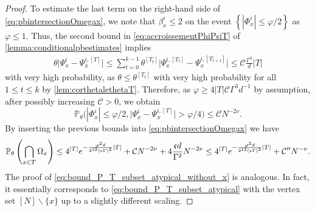 \documentclass[10pt,a4paper]{amsart}
\newcommand{\abs}[1]{\left| #1 \right|}
\newcommand{\ccc}{\mathfrak{c}}
\numberwithin{equation}{section}
\newcommand*\bset[1]{[#1]}
\newcommand{\nc}{\normalcolor}
\begin{document}
\begin{proof}
 To estimate the last term on the right-hand side of \cref{eq:pbintersectionOmegax}, we note that $\beta^{i}_x\le 2$ on the event $\left\{ \abs{\Phi^{i}_x} \le \varphi/2 \right\}$ as $\varphi \le 1$. Thus, the second bound in \cref{eq:accroissementPhiPsiT} of \cref{lemma:conditionalpbestimates} implies
		\begin{align*}
			\theta \bigl| \Psi_{x}^{i} - \Psi_{x}^{i,\bset{T}}\bigr| \le \sum_{t=0}^{k-1} \theta^{\bset{T_t}}\bigl| \Psi_{x}^{i, \bset{T_{t}}} - \Psi_{x}^{i,\bset{T_{t+1}}}\bigr| \le \mathcal{C} \frac{\Gamma^3}{d} \abs{T} 
		\end{align*}
		with very high probability, as 
		$\theta \le \theta^{\bset{T_t}}  $ with very high probability for all $ 1 \le t \le k $ by  \cref{lem:corthetalethetaT}.
 Therefore, as $\varphi \geq 4 \abs{T} \mathcal C \Gamma^{3} d^{-1}$ by assumption,
 after possibly increasing  $\mathcal{C}>0$, we obtain 
		\begin{equation*}
			\mathbb{P}_{\theta} \big( \abs{\Phi^{i}_x} \le \varphi/2,\bigl| \Psi_{x}^{i} - \Psi_{x}^{i,\bset{T}}\bigr| > \varphi/4 \big) \le \mathcal{C} N^{-2\nu}.
		\end{equation*}
		By inserting the previous bounds into \cref{eq:pbintersectionOmegax} we have
		\begin{equation*}
			\mathbb{P}_{\theta}\left( \bigcap_{x \in T}\Omega_x\right) \le   4^{|T|} e^{-\frac{\varphi^2d}{2^{12} (e\Gamma)^2}|T|}  +  \mathcal{C}N^{-2\nu}+  4 \frac{\ccc d}{\Gamma^2} N^{-2 \nu} \le 4^{|T|} e^{-\frac{\varphi^2d}{2^{12} (e\Gamma)^2}|T|} \nc+ \mathcal{C}^{\prime\prime}N^{-\nu}. 
		\end{equation*}
		The proof of \cref{eq:bound_P_T_subset_atypical_without_x} is analogous. In fact, it essentially corresponds to \cref{eq:bound_P_T_subset_atypical} with the vertex set $[N]\backslash\{x\}$ up to a slightly different scaling.   
	\end{proof}
		
\end{document}

